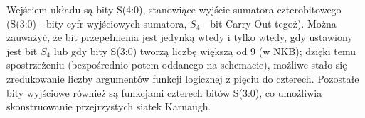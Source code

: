 \documentclass[a4paper,12pt]{extarticle}  %
\begin{document}
  Wejściem układu są bity S(4:0), stanowiące wyjście sumatora czterobitowego (S(3:0) - bity cyfr wyjściowych sumatora, $S_{4}$ - bit Carry Out tegoż). Można zauważyć, że bit przepełnienia jest jedynką wtedy i tylko wtedy, gdy ustawiony jest bit $S_4$ lub gdy bity S(3:0) tworzą liczbę większą od 9 (w NKB); dzięki temu spostrzeżeniu (bezpośrednio potem oddanego na schemacie), możliwe stało się zredukowanie liczby argumentów funkcji logicznej z pięciu do czterech. Pozostałe bity wyjściowe również są funkcjami czterech bitów S(3:0), co umożliwia skonstruowanie przejrzystych siatek Karnaugh.

\end{document}
